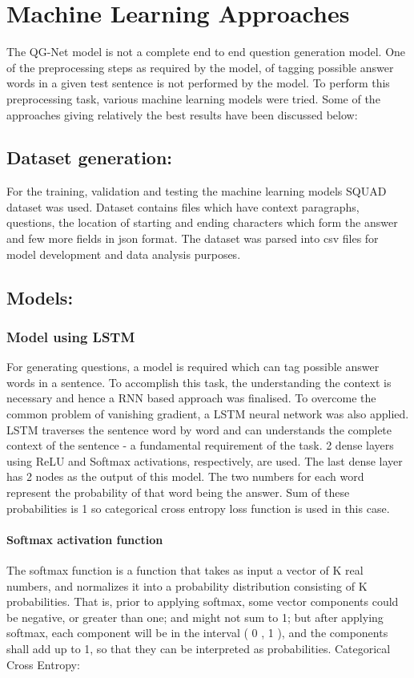 \chapter{Machine Learning Approaches}

The QG-Net model is not a complete end to end question generation model. One of
the preprocessing steps as required by the model, of tagging possible answer
words in a given test sentence is not performed by the model. To perform this
preprocessing task, various machine learning models were tried. Some of the
approaches giving relatively the best results have been discussed below:

\section{Dataset generation:}

For the training, validation and testing the machine learning models SQUAD
dataset was used. Dataset contains files which have context paragraphs,
questions, the location of starting and ending characters which form the answer
and few more fields in json format. The dataset was parsed into csv files for
model development and data analysis purposes. 

\section{Models:}

\subsection{Model using LSTM}
For generating questions, a model is required which can tag possible answer
words in a sentence. To accomplish this task, the understanding the context is
necessary and hence a RNN based approach was finalised. To overcome the common
problem of vanishing gradient, a LSTM neural network was also applied. LSTM
traverses the sentence word by word and can understands the complete context of
the sentence - a fundamental requirement of the task. 2 dense layers using ReLU
and Softmax activations, respectively, are used.
The last dense layer has 2 nodes as the output of this model. The two numbers
for each word represent the probability of that word being the answer. Sum of
these probabilities is 1 so categorical cross entropy loss function is used in
this case.

\subsubsection{Softmax activation function}
The softmax function is a function that takes as input a vector of K real
numbers, and normalizes it into a probability distribution consisting of K
probabilities. That is, prior to applying softmax, some vector components could
be negative, or greater than one; and might not sum to 1; but after applying
softmax, each component will be in the interval ( 0 , 1 ), and the components
shall add up to 1, so that they can be interpreted as probabilities.
Categorical Cross Entropy:

